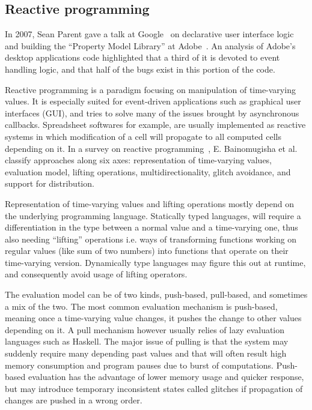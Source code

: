 \subsection{Reactive programming}%
\label{sub:functional_reactive_programming}

In 2007, Sean Parent gave a talk at Google~\cite{parent2007talk, parent2007pdf}
on declarative user interface logic and building
the ``Property Model Library'' at Adobe~\cite{jarvi2008property}.
An analysis of Adobe's desktop applications code highlighted that a third of it
is devoted to event handling logic,
and that half of the bugs exist in this portion of the code.

Reactive programming is a paradigm focusing on manipulation of time-varying values.
It is especially suited for event-driven applications such as graphical user interfaces (GUI),
and tries to solve many of the issues brought by asynchronous callbacks.
Spreadsheet softwares for example, are usually implemented as reactive systems
in which modification of a cell will propagate to all computed cells depending on it.
In a survey on reactive programming~\cite{bainomugisha2013survey},
E. Bainomugisha et al. classify approaches along six axes:
representation of time-varying values, evaluation model, lifting operations,
multidirectionality, glitch avoidance, and support for distribution.

Representation of time-varying values and lifting operations
mostly depend on the underlying programming language.
Statically typed languages, will require a differentiation in the type
between a normal value and a time-varying one,
thus also needing ``lifting'' operations i.e. ways of transforming
functions working on regular values (like sum of two numbers)
into functions that operate on their time-varying version.
Dynamically type languages may figure this out at runtime,
and consequently avoid usage of lifting operators.

The evaluation model can be of two kinds,
push-based, pull-based, and sometimes a mix of the two.
The most common evaluation mechanism is push-based,
meaning once a time-varying value changes,
it pushes the change to other values depending on it.
A pull mechanism however usually relies of lazy evaluation languages such as Haskell.
The major issue of pulling is that the system may suddenly
require many depending past values and that will often result high memory consumption
and program pauses due to burst of computations.
Push-based evaluation has the advantage of lower memory usage
and quicker response, but may introduce temporary inconsistent states called glitches
if propagation of changes are pushed in a wrong order.

